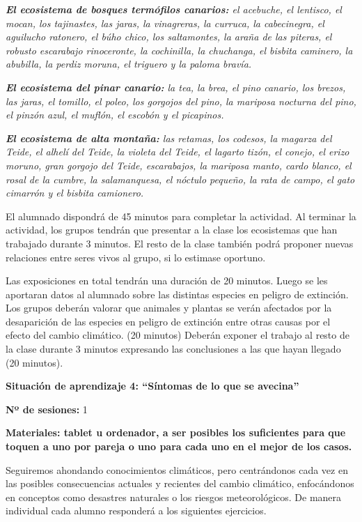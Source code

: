 \documentclass[
]{article}
\begin{document}
\emph{\textbf{El ecosistema de bosques termófilos canarios:} el
acebuche, el lentisco, el mocan, los tajinastes, las jaras, la
vinagreras, la curruca, la cabecinegra, el aguilucho ratonero, el búho
chico, los saltamontes, la araña de las piteras, el robusto escarabajo
rinoceronte, la cochinilla, la chuchanga, el bisbita caminero, la
abubilla, la perdiz moruna, el triguero y la paloma bravía.}

\emph{\textbf{El ecosistema del pinar canario:} la tea, la brea, el pino
canario, los brezos, las jaras, el tomillo, el poleo, los gorgojos del
pino, la mariposa nocturna del pino, el pinzón azul, el muflón, el
escobón y el picapinos.}

\emph{\textbf{El ecosistema de alta montaña:} las retamas, los codesos,
la magarza del Teide, el alhelí del Teide, la violeta del Teide, el
lagarto tizón, el conejo, el erizo moruno, gran gorgojo del Teide,
escarabajos, la mariposa manto, cardo blanco, el rosal de la cumbre, la
salamanquesa, el nóctulo pequeño, la rata de campo, el gato cimarrón y
el bisbita camionero.}

El alumnado dispondrá de 45 minutos para completar la actividad. Al
terminar la actividad, los grupos tendrán que presentar a la clase los
ecosistemas que han trabajado durante 3 minutos. El resto de la clase
también podrá proponer nuevas relaciones entre seres vivos al grupo, si
lo estimase oportuno.

Las exposiciones en total tendrán una duración de 20 minutos. Luego se
les aportaran datos al alumnado sobre las distintas especies en peligro
de extinción. Los grupos deberán valorar que animales y plantas se verán
afectados por la desaparición de las especies en peligro de extinción
entre otras causas por el efecto del cambio climático. (20 minutos)
Deberán exponer el trabajo al resto de la clase durante 3 minutos
expresando las conclusiones a las que hayan llegado (20 minutos).

\textbf{Situación de aprendizaje 4: ``Síntomas de lo que se avecina''}

\textbf{Nº de sesiones:} 1

\textbf{Materiales: tablet u ordenador, a ser posibles los suficientes
para que toquen a uno por pareja o uno para cada uno en el mejor de los
casos.}

Seguiremos ahondando conocimientos climáticos, pero centrándonos cada
vez en las posibles consecuencias actuales y recientes del cambio
climático, enfocándonos en conceptos como desastres naturales o los
riesgos meteorológicos. De manera individual cada alumno responderá a
los siguientes ejercicios.
\end{document}
